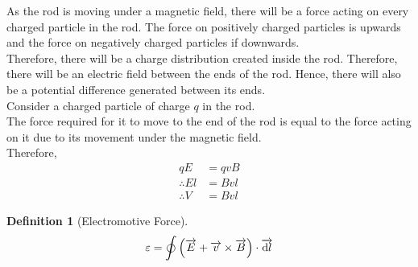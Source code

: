 \documentclass[fleqn, a4paper, 12pt, twoside]{article}
\theoremstyle{definition}
\newtheorem{definition}{Definition}
\theoremstyle{theorem}
\begin{document}
\begin{solution}
	As the rod is moving under a magnetic field, there will be a force acting on every charged particle in the rod.
	The force on positively charged particles is upwards and the force on negatively charged particles if downwards.\\
	Therefore, there will be a charge distribution created inside the rod.
	Therefore, there will be an electric field between the ends of the rod.
	Hence, there will also be a potential difference generated between its ends.\\
	Consider a charged particle of charge $q$ in the rod.\\
	The force required for it to move to the end of the rod is equal to the force acting on it due to its movement under the magnetic field.\\
	Therefore,
	\begin{align*}
		q E            & = q v B \\
		\therefore E l & = B v l \\
		\therefore V   & = B v l
	\end{align*}
\end{solution}

\begin{definition}[Electromotive Force]
	\begin{equation*}
		\varepsilon = \oint \left( \overrightarrow{E} + \overrightarrow{v} \times \overrightarrow{B} \right) \cdot \overrightarrow{\dif l}
	\end{equation*}
\end{definition}
\end{document}
